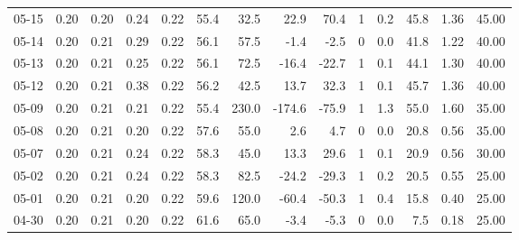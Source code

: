 \begin{threeparttable}
{\begin{tabular}{lrrrrrrrrrrrrr}
  05-15 &          0.20 &          0.20 &          0.24 &        0.22 &                55.4 &                32.5 &       22.9 &         70.4 &              1 &                 0.2 &             45.8 &            1.36 &                  45.00 \\
  05-14 &          0.20 &          0.21 &          0.29 &        0.22 &                56.1 &                57.5 &       -1.4 &         -2.5 &              0 &                 0.0 &             41.8 &            1.22 &                  40.00 \\
  05-13 &          0.20 &          0.21 &          0.25 &        0.22 &                56.1 &                72.5 &      -16.4 &        -22.7 &              1 &                 0.1 &             44.1 &            1.30 &                  40.00 \\
  05-12 &          0.20 &          0.21 &          0.38 &        0.22 &                56.2 &                42.5 &       13.7 &         32.3 &              1 &                 0.1 &             45.7 &            1.36 &                  40.00 \\
  05-09 &          0.20 &          0.21 &          0.21 &        0.22 &                55.4 &               230.0 &     -174.6 &        -75.9 &              1 &                 1.3 &             55.0 &            1.60 &                  35.00 \\
  05-08 &          0.20 &          0.21 &          0.20 &        0.22 &                57.6 &                55.0 &        2.6 &          4.7 &              0 &                 0.0 &             20.8 &            0.56 &                  35.00 \\
  05-07 &          0.20 &          0.21 &          0.24 &        0.22 &                58.3 &                45.0 &       13.3 &         29.6 &              1 &                 0.1 &             20.9 &            0.56 &                  30.00 \\
  05-02 &          0.20 &          0.21 &          0.24 &        0.22 &                58.3 &                82.5 &      -24.2 &        -29.3 &              1 &                 0.2 &             20.5 &            0.55 &                  25.00 \\
  05-01 &          0.20 &          0.21 &          0.20 &        0.22 &                59.6 &               120.0 &      -60.4 &        -50.3 &              1 &                 0.4 &             15.8 &            0.40 &                  25.00 \\
  04-30 &          0.20 &          0.21 &          0.20 &        0.22 &                61.6 &                65.0 &       -3.4 &         -5.3 &              0 &                 0.0 &              7.5 &            0.18 &                  25.00 \\

\end{tabular}}
\end{threeparttable}
